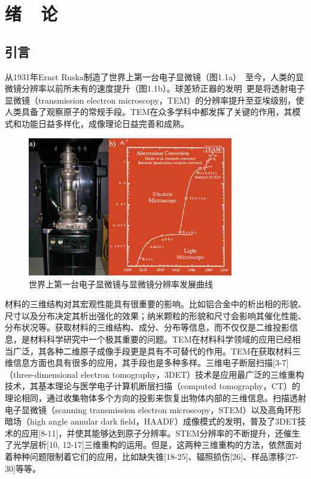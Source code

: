 
\chapter{绪~~论}
\section{引言}

从1931年Ernst Ruska制造了世界上第一台电子显微镜（图1.1a）~\cite{das1932}至今，人类的显微镜分辨率以前所未有的速度提升（图1.1b）。球差矫正器的发明~\cite{dev1997}更是将透射电子显微镜（transmission electron microscopy，TEM）的分辨率提升至亚埃级别，使人类具备了观察原子的常规手段。TEM在众多学科中都发挥了关键的作用，其模式和功能日益多样化，成像理论日益完善和成熟。 

\begin{figure}[htbp]
	\vspace{\baselineskip}
	\centering
	\includegraphics[width=0.8\textwidth]{../1.1/11}
	\caption{世界上第一台电子显微镜与显微镜分辨率发展曲线}\label{fig:11}
	\song{}
\end{figure}

材料的三维结构对其宏观性能具有很重要的影响。比如铝合金中的析出相的形貌、尺寸以及分布决定其析出强化的效果；纳米颗粒的形貌和尺寸会影响其催化性能、分布状况等。获取材料的三维结构、成分、分布等信息，而不仅仅是二维投影信息，是材料科学研究中一个极其重要的问题。TEM在材料科学领域的应用已经相当广泛，其各种二维原子成像手段更是具有不可替代的作用。TEM在获取材料三维信息方面也具有很多的应用，其手段也是多种多样。三维电子断层扫描[3-7]（three-dimensional electron tomography，3DET）技术是应用最广泛的三维重构技术，其基本理论与医学电子计算机断层扫描（computed tomography，CT）的理论相同，通过收集物体多个方向的投影来恢复出物体内部的三维信息。扫描透射电子显微镜（scanning transmission electron microscopy，STEM）以及高角环形暗场（high angle annular dark field，HAADF）成像模式的发明，普及了3DET技术的应用[8-11]，并使其能够达到原子分辨率。STEM分辨率的不断提升，还催生了光学层析[10, 12-17]三维重构的运用。但是，这两种三维重构的方法，依然面对着种种问题限制着它们的应用，比如缺失锥[18-25]、辐照损伤[26]、样品漂移[27-30]等等。